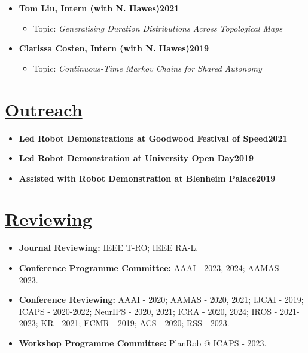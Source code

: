 \documentclass[11pt]{article}
\begin{document}
\begin{itemize}
\begin{itemize}
\end{itemize}
\item \textbf{Tom Liu, Intern (with N. Hawes)\hfill 2021}
\begin{itemize}
\item Topic: \emph{Generalising Duration Distributions Across Topological Maps}
\end{itemize}
\item \textbf{Clarissa Costen, Intern (with N. Hawes)\hfill 2019}
\begin{itemize}
\item Topic: \emph{Continuous-Time Markov Chains for Shared Autonomy}
\end{itemize}
\end{itemize}

\vspace{-10pt}
\section*{\uline{Outreach\hfill}}
\vspace{-5pt}
\begin{itemize}
\item \textbf{Led Robot Demonstrations at Goodwood Festival of Speed\hfill 2021}
\item \textbf{Led Robot Demonstration at University Open Day\hfill 2019}
\item \textbf{Assisted with Robot Demonstration at Blenheim Palace\hfill 2019}
\end{itemize}



\vspace{-10pt}
\section*{\uline{Reviewing\hfill}}
\vspace{-5pt}
\begin{itemize}
\item \textbf{Journal Reviewing:} IEEE T-RO; IEEE RA-L.
\item \textbf{Conference Programme Committee:}  AAAI - 2023, 2024; AAMAS - 2023.
\item \textbf{Conference Reviewing:} AAAI - 2020; AAMAS - 2020, 2021; IJCAI - 2019; ICAPS - 2020-2022; NeurIPS - 2020, 2021; ICRA - 2020, 2024; IROS - 2021-2023; KR - 2021; ECMR - 2019; ACS - 2020; RSS - 2023.
\item\textbf{Workshop Programme Committee:} PlanRob @ ICAPS - 2023.
\end{itemize}
\end{document}
